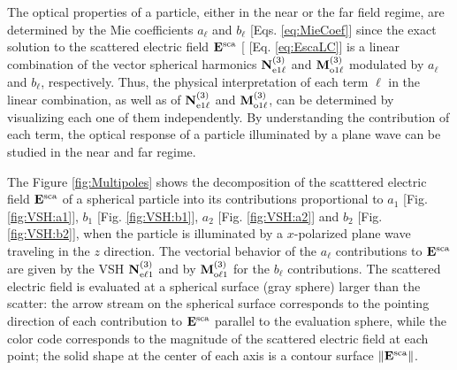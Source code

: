 
The optical properties of a particle, either in the near or the far field regime,  are determined by the Mie coefficients   $a_\ell$ and $b_\ell$ [Eqs. \eqref{eq:MieCoef}] since the exact solution to the scattered electric field $\vb{E}^\text{sca}$ [ [Eq. \eqref{eq:EscaLC}] is a linear combination of the vector spherical harmonics $\vb{N}^{(3)}_{\text{e}1\ell}$ and $\vb{M}^{(3)}_{\text{o}1\ell}$ modulated by  $a_\ell$ and $b_\ell$, respectively. Thus, the physical interpretation of each term $\ell$ in the linear combination, as well as of $\vb{N}^{(3)}_{\text{e}1\ell}$ and $\vb{M}^{(3)}_{\text{o}1\ell}$, can be determined by visualizing each one of them independently. By understanding the contribution of each term, the optical response of a particle illuminated by a plane wave can be studied in the near and far regime.

The Figure \ref{fig:Multipoles} shows the decomposition of the scatttered electric field  $\vb{E}^\text{sca}$ of a spherical particle into its contributions proportional to $a_1$ [Fig. \ref{fig:VSH:a1}], $b_1$ [Fig. \ref{fig:VSH:b1}], $a_2$ [Fig. \ref{fig:VSH:a2}] and $b_2$ [Fig. \ref{fig:VSH:b2}], when the particle is illuminated by a $x$-polarized plane wave traveling in the $z$ direction. The vectorial behavior of the $a_\ell$ contributions to $\vb{E}^\text{sca}$ are given by the VSH $\vb{N}^{(3)}_{\text{e}\ell 1}$ and by $\vb{M}^{(3)}_{\text{o}\ell 1}$ for the $b_\ell$ contributions. The  scattered electric field  is evaluated at a spherical surface (gray sphere) larger than the scatter: the arrow stream on the spherical surface corresponds to the pointing direction of each contribution to $\vb{E}^\text{sca}$ parallel to the evaluation sphere, while the color code corresponds to the magnitude of the scattered electric field at each point; the solid shape at the center of each axis is a contour surface $\norm{\vb{E}^\text{sca}}$.
%

